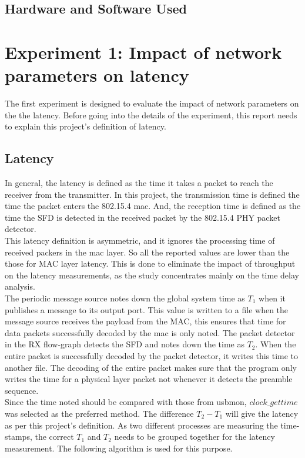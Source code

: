 \subsection{Hardware and Software Used}

\section{Experiment 1: Impact of network parameters on latency}

The first experiment is designed to evaluate the impact of network parameters on the the latency.
Before going into the details of the experiment, this report needs to explain this project's definition of latency.

\subsection{Latency}
In general, the latency is defined as the time it takes a packet to reach the receiver from the transmitter.
In this project, the transmission time is defined the time the packet enters the 802.15.4 \ac{mac}.
And, the reception time is defined as the time the SFD is detected in the received packet by the 802.15.4 PHY packet detector.\\

This latency definition is asymmetric, and it ignores the processing time of received packers in the \ac{mac} layer. So all the reported values are lower than the those for MAC layer latency.
This is done to eliminate the impact of throughput on the latency measurements, as the study concentrates mainly on the time delay analysis.\\

The periodic message source notes down the global system time as $T_1$ when it publishes a message to its output port.
This value is written to a file when the message source receives the payload from the MAC, this ensures that time for data packets successfully decoded by the \ac{mac} is only noted.
The packet detector in the RX flow-graph detects the SFD and notes down the time as $T_2$.
When the entire packet is successfully decoded by the packet detector, it writes this time to another file.
The decoding of the entire packet makes sure that the program only writes the time for a physical layer packet not whenever it detects the preamble sequence.\\

Since the time noted should be compared with those from usbmon, $clock\_{gettime}$ was selected as the preferred method. 
The difference $T_2 - T_1$ will give the latency as per this project's definition.
As two different processes are measuring the time-stamps, the correct $T_1$ and $T_2$ needs to be grouped together for the latency measurement. 
The following algorithm is used for this purpose.

